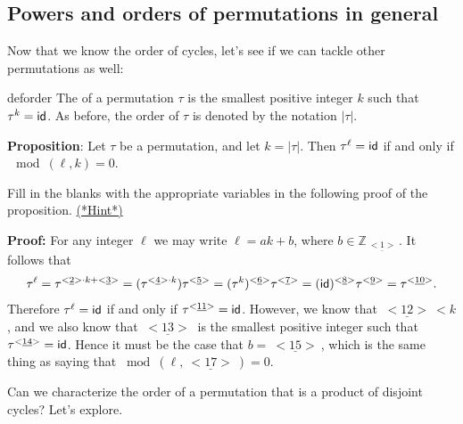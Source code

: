 \subsection{Powers and orders of permutations in general}
\label{subsec:Permutations:CycleAlgebraicProperties:PowerAndOrderGeneral}

Now that we know the order of cycles, let's see if we can tackle other permutations as well:

\begin{defn}{deforder}
The  of a permutation $\tau$ is the smallest positive integer $k$ such that $\tau^k = {\sf{i}d}$.   As before, the order of $\tau$ is denoted by the notation $|\tau|$. 
\end{defn}



\noindent
{\bf Proposition}: Let $\tau$ be a permutation, and let $k = |\tau|$. Then $\tau^{\ell} = {\sf{i}d}$ if and only if $\mod(\ell,k)=0$.
\medskip

\begin{exercise}{64}
Fill in the blanks with the appropriate variables in the following proof of the proposition.
\hyperref[sec:Permutations:Hints]{(*Hint*)}
\medskip

\noindent
{\bf Proof:} For any integer $\ell$ we may write $\ell = ak + b$, where $b \in \mathbb{Z}_{\underline{~<1>~}} $. It follows that
\[ \tau^{\ell} = \tau^{<\underline{2}> \cdot k + <\underline{3}>} = (\tau^{<\underline{4}> \cdot k})\tau^{<\underline{5}>} =   (\tau^k)^{<\underline{6}>}\tau^{<\underline{7}>} = ({\sf{i}d})^{<\underline{8}>}\tau^{<\underline{9}>} = \tau^{<\underline{10}>} . \]
Therefore $\tau^{\ell} = {\sf{i}d}$ if and only if $\tau^{<\underline{11}>} = {\sf{i}d}$. However, we know that $\underline{~<12>~} < k$, and we also know that $\underline{~<13>~}$ is the smallest positive integer such that  $\tau^{<\underline{14}>} = {\sf{i}d}$. Hence it must be the case that $b= \underline{~<15>~}$, which is the same thing as saying that  $\bmod(\ell,\underline{~<17>~})=0$.
\end{exercise}


Can we characterize the order of a permutation that is a product of disjoint cycles?  Let's explore.

